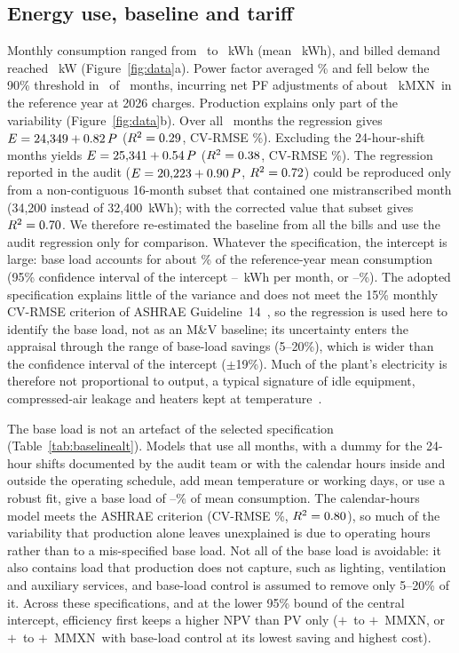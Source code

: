 \documentclass[processes,article,submit,pdftex,moreauthors]{Definitions/mdpi}
\newcommand{\MXN}{MXN}
\begin{document}
\subsection{Energy use, baseline and tariff}
\label{sec:baseres}
Monthly consumption ranged from \nKWhMin\ to \nKWhMax~kWh (mean \nKWhMean~kWh), and billed demand reached \nKWMax~kW (Figure~\ref{fig:data}a). Power factor averaged \nPFMean\% and fell below the 90\% threshold in \nMonthsPFLow\ of \nNMonths\ months, incurring net PF adjustments of about \nPFSurcharge~k\MXN\ in the reference year at 2026 charges. Production explains only part of the variability (Figure~\ref{fig:data}b). Over all \nNAll\ months the regression gives $E = 24{,}349 + 0.82\,P$ ($R^2 = 0.29$, CV-RMSE \nCVAll\%). Excluding the 24-hour-shift months yields $E = 25{,}341 + 0.54\,P$ ($R^2 = 0.38$, CV-RMSE \nCVExcl\%). The regression reported in the audit ($E = 20{,}223 + 0.90\,P$, $R^2 = 0.72$) could be reproduced only from a non-contiguous 16-month subset that contained one mistranscribed month (34,200 instead of 32,400~kWh); with the corrected value that subset gives $R^2 = 0.70$. We therefore re-estimated the baseline from all the bills and use the audit regression only for comparison. Whatever the specification, the intercept is large: base load accounts for about \nBaseShare\% of the reference-year mean consumption (95\% confidence interval of the intercept \nIntCILo--\nIntCIHi~kWh per month, or \nBaseShareLo--\nBaseShareHi\%). The adopted specification explains little of the variance and does not meet the 15\% monthly CV-RMSE criterion of ASHRAE Guideline~14~\cite{ashrae14}, so the regression is used here to identify the base load, not as an M\&V baseline; its uncertainty enters the appraisal through the range of base-load savings (5--20\%), which is wider than the confidence interval of the intercept ($\pm$19\%). Much of the plant's electricity is therefore not proportional to output, a typical signature of idle equipment, compressed-air leakage and heaters kept at temperature~\cite{kara2011,gutowski2009}.

The base load is not an artefact of the selected specification (Table~\ref{tab:baselinealt}). Models that use all months, with a dummy for the 24-hour shifts documented by the audit team or with the calendar hours inside and outside the operating schedule, add mean temperature or working days, or use a robust fit, give a base load of \nBABaseLoSpec--\nBABaseHi\% of mean consumption. The calendar-hours model meets the ASHRAE criterion (CV-RMSE \nBACalCV\%, $R^2 = 0.80$), so much of the variability that production alone leaves unexplained is due to operating hours rather than to a mis-specified base load. Not all of the base load is avoidable: it also contains load that production does not capture, such as lighting, ventilation and auxiliary services, and base-load control is assumed to remove only 5--20\% of it. Across these specifications, and at the lower 95\% bound of the central intercept, efficiency first keeps a higher NPV than PV only ($+$\nBAGainLo\ to $+$\nBAGainHi~M\MXN, or $+$\nBALowELo\ to $+$\nBALowEHi~M\MXN\ with base-load control at its lowest saving and highest cost).
\end{document}
